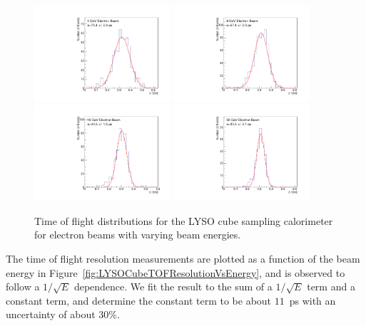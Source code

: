 \documentclass[12pt]{article}
\begin{document}
\begin{figure}[h] \centering
\includegraphics[width=0.45\textwidth]{figs/TOF_Electron_LYSOCube_4GeV} 
\includegraphics[width=0.45\textwidth]{figs/TOF_Electron_LYSOCube_8GeV} 
\includegraphics[width=0.45\textwidth]{figs/TOF_Electron_LYSOCube_16GeV} 
\includegraphics[width=0.45\textwidth]{figs/TOF_Electron_LYSOCube_32GeV} 
\caption{ Time of flight distributions for the LYSO cube sampling calorimeter
for electron beams with varying beam energies. } 
\label{fig:LYSOCubeTOF}
\end{figure}

The time of flight resolution measurements are plotted as a function of the
beam energy in Figure~\ref{fig:LYSOCubeTOFResolutionVsEnergy}, and is observed
to follow a $1/\sqrt{E}$ dependence. We fit the result to the sum of a 
$1/\sqrt{E}$ term and a constant term, and determine the constant term to
be about $11$~ps with an uncertainty of about $30\%$. 
\end{document}
